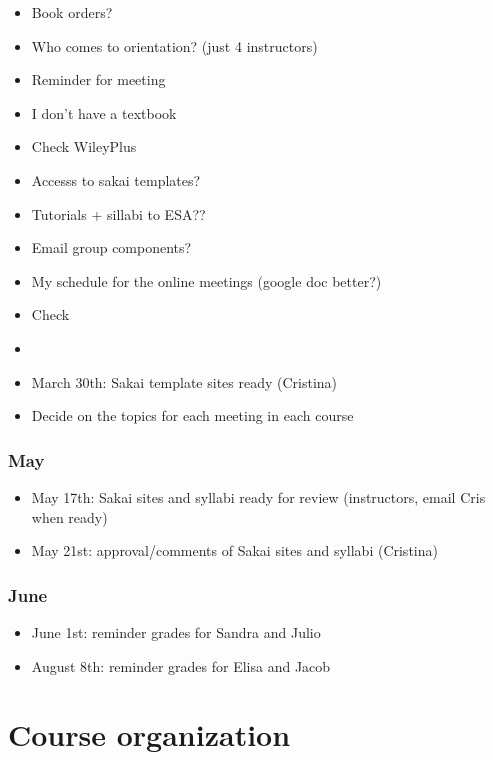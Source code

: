 \documentclass[]{article}
\providecommand{\tightlist}{%
  \setlength{\itemsep}{0pt}\setlength{\parskip}{0pt}}
\begin{document}
\begin{itemize}
\item
  Book orders?
\item
  Who comes to orientation? (just 4 instructors)
\item
  Reminder for meeting
\item
  I don't have a textbook
\item
  Check WileyPlus
\item
  Accesss to sakai templates?
\item
  Tutorials + sillabi to ESA??
\item
  Email group components?
\item
  My schedule for the online meetings (google doc better?)
\item
  Check
\item
\item
  March 30th: Sakai template sites ready (Cristina)
\item
  Decide on the topics for each meeting in each course
\end{itemize}

\subsubsection{May}\label{may}

\begin{itemize}
\tightlist
\item
  May 17th: Sakai sites and syllabi ready for review (instructors, email
  Cris when ready)
\item
  May 21st: approval/comments of Sakai sites and syllabi (Cristina)
\end{itemize}

\subsubsection{June}\label{june}

\begin{itemize}
\tightlist
\item
  June 1st: reminder grades for Sandra and Julio
\item
  August 8th: reminder grades for Elisa and Jacob
\end{itemize}

\section{Course organization}\label{course-organization}
\end{document}
